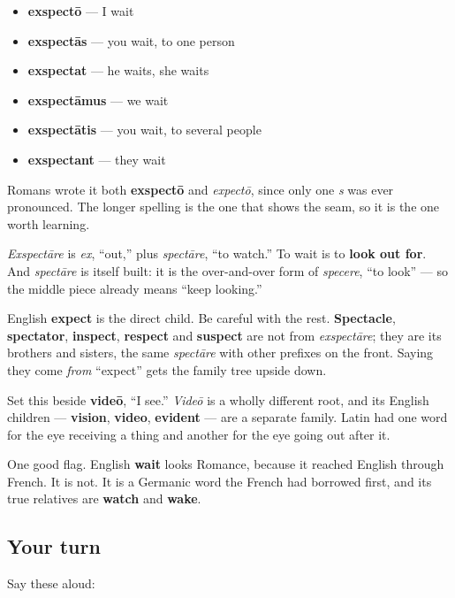 \begin{itemize}
\raggedright
  \item \textbf{exspectō} — I wait
  \item \textbf{exspectās} — you wait, to one person
  \item \textbf{exspectat} — he waits, she waits
  \item \textbf{exspectāmus} — we wait
  \item \textbf{exspectātis} — you wait, to several people
  \item \textbf{exspectant} — they wait
\end{itemize}

Romans wrote it both \textbf{exspectō} and \emph{expectō}, since only one \emph{s} was ever pronounced. The longer spelling is the one that shows the seam, so it is the one worth learning.

\begin{cousinweb}
\emph{Exspectāre} is \emph{ex}, \textquotedblleft{}out,\textquotedblright{} plus \emph{spectāre}, \textquotedblleft{}to watch.\textquotedblright{} To wait is to \textbf{look out for}. And \emph{spectāre} is itself built: it is the over-and-over form of \emph{specere}, \textquotedblleft{}to look\textquotedblright{} — so the middle piece already means \textquotedblleft{}keep looking.\textquotedblright{}

English \textbf{expect} is the direct child. Be careful with the rest. \textbf{Spectacle}, \textbf{spectator}, \textbf{inspect}, \textbf{respect} and \textbf{suspect} are not from \emph{exspectāre}; they are its brothers and sisters, the same \emph{spectāre} with other prefixes on the front. Saying they come \emph{from} \textquotedblleft{}expect\textquotedblright{} gets the family tree upside down.

Set this beside \textbf{videō}, \textquotedblleft{}I see.\textquotedblright{} \emph{Videō} is a wholly different root, and its English children — \textbf{vision}, \textbf{video}, \textbf{evident} — are a separate family. Latin had one word for the eye receiving a thing and another for the eye going out after it.

One good flag. English \textbf{wait} looks Romance, because it reached English through French. It is not. It is a Germanic word the French had borrowed first, and its true relatives are \textbf{watch} and \textbf{wake}.
\end{cousinweb}

\subsection*{Your turn}
Say these aloud:

